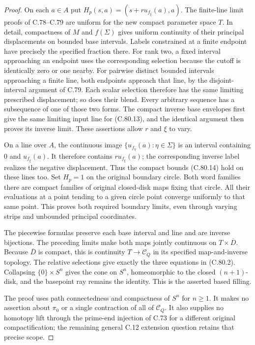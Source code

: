 \begin{proof}
On each $a\in A$ put
$H_p(s,a)=(s+r u_{f_\xi}(a),a)$.
The finite-line limit proofs of C.78--C.79
are uniform for the new compact parameter
space $T$. In detail, compactness of $M$
and $f(\Sigma)$ gives uniform continuity
of their principal displacements on bounded
base intervals. Labels constrained at a
finite endpoint have precisely the specified
fraction there. For rank two, a fixed interval
approaching an endpoint uses the corresponding
selection because the cutoff is identically
zero or one nearby. For pairwise distinct
bounded intervals approaching a finite line,
both endpoints approach that line, by the
disjoint-interval argument of C.79. Each scalar
selection therefore has the same limiting
prescribed displacement; so does their blend.
Every arbitrary sequence has a subsequence
of one of those two forms. The compact inverse
base envelopes first give the same limiting
input line for (C.80.13), and the identical
argument then proves its inverse limit.
These assertions allow $r$ and $\xi$ to vary.

On a line over $A$, the continuous image
$\{u_{f_\eta}(a):\eta\in\Sigma\}$ is an interval
containing $0$ and $u_{f_\xi}(a)$. It therefore
contains $r u_{f_\xi}(a)$; the corresponding
inverse label realizes the negative displacement.
Thus the compact bounds (C.80.14) hold on
these lines too. Set $H_p=1$ on the original
boundary circle. Both word families there
are compact families of original closed-disk
maps fixing that circle. All their evaluations
at a point tending to a given circle point
converge uniformly to that same point. This
proves both required boundary limits, even
through varying strips and unbounded principal
coordinates.

The piecewise formulas preserve each base
interval and line and are inverse bijections.
The preceding limits make both maps jointly
continuous on $T\times\overline D$. Because
$\overline D$ is compact, this is continuity
$T\to\mathscr C_Q$ in its specified map-and-inverse
topology. The relative selections give exactly
the three equations in (C.80.2). Collapsing
$\{0\}\times S^n$ gives the cone on $S^n$,
homeomorphic to the closed $(n+1)$-disk, and
the basepoint ray remains the identity.
This is the asserted based filling.

The proof uses path connectedness and compactness
of $S^n$ for $n\geq1$. It makes no assertion
about $\pi_0$ or a single contraction of all
of $\mathscr C_Q$. It also supplies no homotopy
lift through the prime-end injection of C.73
for a different original compactification;
the remaining general C.12 extension question
retains that precise scope.
\end{proof}
